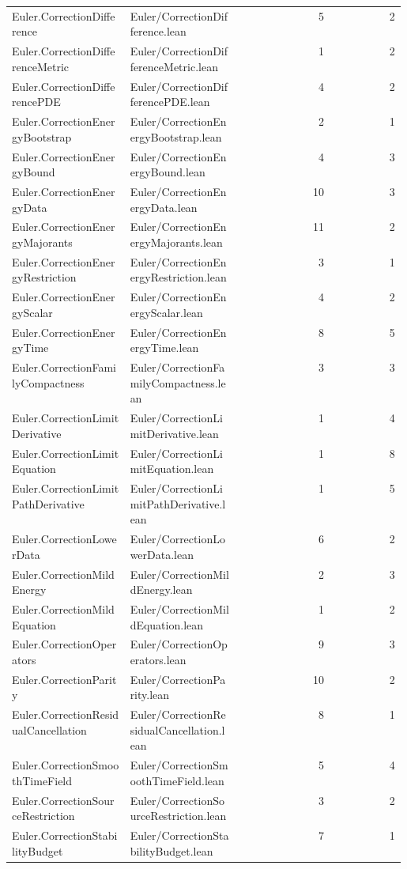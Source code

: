 \begin{longtable}{p{0.30\linewidth}p{0.28\linewidth}rr}
Euler.CorrectionDifference & Euler/CorrectionDifference.lean & 5 & 2\\
Euler.CorrectionDifferenceMetric & Euler/CorrectionDifferenceMetric.lean & 1 & 2\\
Euler.CorrectionDifferencePDE & Euler/CorrectionDifferencePDE.lean & 4 & 2\\
Euler.CorrectionEnergyBootstrap & Euler/CorrectionEnergyBootstrap.lean & 2 & 1\\
Euler.CorrectionEnergyBound & Euler/CorrectionEnergyBound.lean & 4 & 3\\
Euler.CorrectionEnergyData & Euler/CorrectionEnergyData.lean & 10 & 3\\
Euler.CorrectionEnergyMajorants & Euler/CorrectionEnergyMajorants.lean & 11 & 2\\
Euler.CorrectionEnergyRestriction & Euler/CorrectionEnergyRestriction.lean & 3 & 1\\
Euler.CorrectionEnergyScalar & Euler/CorrectionEnergyScalar.lean & 4 & 2\\
Euler.CorrectionEnergyTime & Euler/CorrectionEnergyTime.lean & 8 & 5\\
Euler.CorrectionFamilyCompactness & Euler/CorrectionFamilyCompactness.lean & 3 & 3\\
Euler.CorrectionLimitDerivative & Euler/CorrectionLimitDerivative.lean & 1 & 4\\
Euler.CorrectionLimitEquation & Euler/CorrectionLimitEquation.lean & 1 & 8\\
Euler.CorrectionLimitPathDerivative & Euler/CorrectionLimitPathDerivative.lean & 1 & 5\\
Euler.CorrectionLowerData & Euler/CorrectionLowerData.lean & 6 & 2\\
Euler.CorrectionMildEnergy & Euler/CorrectionMildEnergy.lean & 2 & 3\\
Euler.CorrectionMildEquation & Euler/CorrectionMildEquation.lean & 1 & 2\\
Euler.CorrectionOperators & Euler/CorrectionOperators.lean & 9 & 3\\
Euler.CorrectionParity & Euler/CorrectionParity.lean & 10 & 2\\
Euler.CorrectionResidualCancellation & Euler/CorrectionResidualCancellation.lean & 8 & 1\\
Euler.CorrectionSmoothTimeField & Euler/CorrectionSmoothTimeField.lean & 5 & 4\\
Euler.CorrectionSourceRestriction & Euler/CorrectionSourceRestriction.lean & 3 & 2\\
Euler.CorrectionStabilityBudget & Euler/CorrectionStabilityBudget.lean & 7 & 1\\

\end{longtable}
